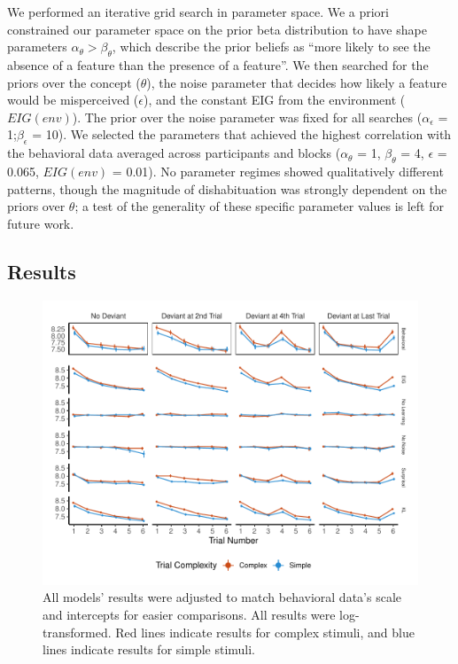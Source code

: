 \documentclass[10pt, letterpaper]{article}
\newenvironment{CodeChunk}{}{}
\begin{document}
We performed an iterative grid search in parameter space. We a priori
constrained our parameter space on the prior beta distribution to have
shape parameters \(\alpha_{\theta} > \beta_{\theta}\), which describe
the prior beliefs as ``more likely to see the absence of a feature than
the presence of a feature''. We then searched for the priors over the
concept (\(\theta\)), the noise parameter that decides how likely a
feature would be misperceived (\(\epsilon\)), and the constant EIG from
the environment (\(EIG(env)\)). The prior over the noise parameter was
fixed for all searches (\(\alpha_{\epsilon}\) = 1;\(\beta_{\epsilon}\) =
10). We selected the parameters that achieved the highest correlation
with the behavioral data averaged across participants and blocks
(\(\alpha_{\theta}\) = 1, \(\beta_{\theta}\) = 4, \(\epsilon\) = 0.065,
\(EIG(env)\) = 0.01). No parameter regimes showed qualitatively
different patterns, though the magnitude of dishabituation was strongly
dependent on the priors over \(\theta\); a test of the generality of
these specific parameter values is left for future work.

\hypertarget{results-1}{%
\subsection{Results}\label{results-1}}

\begin{CodeChunk}
\begin{figure}[t!]

{\centering \includegraphics{figs/experiment_res-1} 

}

\caption[All models’ results were adjusted to match behavioral data’s scale and intercepts for easier comparisons]{All models’ results were adjusted to match behavioral data’s scale and intercepts for easier comparisons. All results were log-transformed. Red lines indicate results for complex stimuli, and blue lines indicate results for simple stimuli.}\label{fig:experiment_res}
\end{figure}
\end{CodeChunk}
\end{document}
